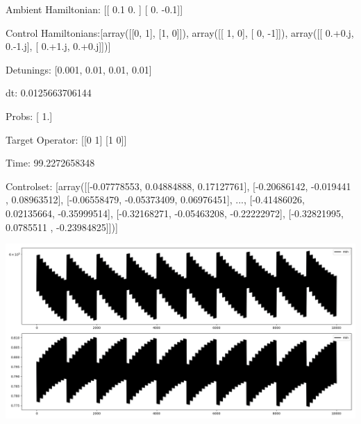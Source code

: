 \documentclass{article}
\begin{document}
    

\newpage

Ambient Hamiltonian: [[ 0.1  0. ]
 [ 0.  -0.1]]

Control Hamiltonians:[array([[0, 1],
       [1, 0]]), array([[ 1,  0],
       [ 0, -1]]), array([[ 0.+0.j,  0.-1.j],
       [ 0.+1.j,  0.+0.j]])]

Detunings: [0.001, 0.01, 0.01, 0.01]

 dt: 0.0125663706144

Probs: [ 1.]

Target Operator: [[0 1]
 [1 0]]

Time: 99.2272658348

Controlset: [array([[-0.07778553,  0.04884888,  0.17127761],
       [-0.20686142, -0.019441  ,  0.08963512],
       [-0.06558479, -0.05373409,  0.06976451],
       ..., 
       [-0.41486026,  0.02135664, -0.35999514],
       [-0.32168271, -0.05463208, -0.22222972],
       [-0.32821995,  0.0785511 , -0.23984825]])]
\begin{center}
\includegraphics[scale=.9]{control_dpn_all.png}

\end{center}
\end{document}
